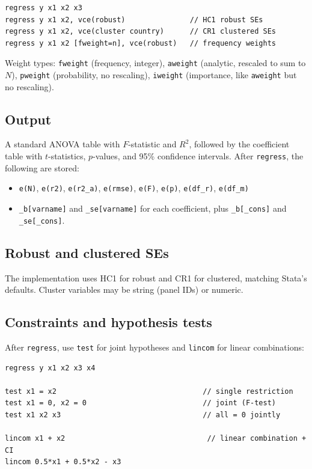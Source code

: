 \documentclass[11pt,letterpaper]{article}
\begin{document}
\begin{lstlisting}
regress y x1 x2 x3
regress y x1 x2, vce(robust)               // HC1 robust SEs
regress y x1 x2, vce(cluster country)      // CR1 clustered SEs
regress y x1 x2 [fweight=n], vce(robust)   // frequency weights
\end{lstlisting}

Weight types: \texttt{fweight} (frequency, integer), \texttt{aweight}
(analytic, rescaled to sum to $N$), \texttt{pweight} (probability,
no rescaling), \texttt{iweight} (importance, like \texttt{aweight} but
no rescaling).

\subsection{Output}

A standard ANOVA table with $F$-statistic and $R^2$, followed by the
coefficient table with $t$-statistics, $p$-values, and 95\% confidence
intervals.  After \texttt{regress}, the following are stored:

\begin{itemize}
\item \texttt{e(N)}, \texttt{e(r2)}, \texttt{e(r2\_a)}, \texttt{e(rmse)},
  \texttt{e(F)}, \texttt{e(p)}, \texttt{e(df\_r)}, \texttt{e(df\_m)}
\item \texttt{\_b[varname]} and \texttt{\_se[varname]} for each
  coefficient, plus \texttt{\_b[\_cons]} and \texttt{\_se[\_cons]}.
\end{itemize}

\subsection{Robust and clustered SEs}

The implementation uses HC1 for robust and CR1 for clustered, matching
Stata's defaults.  Cluster variables may be string (panel IDs) or
numeric.

\subsection{Constraints and hypothesis tests}

After \texttt{regress}, use \texttt{test} for joint hypotheses and
\texttt{lincom} for linear combinations:

\begin{lstlisting}
regress y x1 x2 x3 x4

test x1 = x2                                  // single restriction
test x1 = 0, x2 = 0                           // joint (F-test)
test x1 x2 x3                                 // all = 0 jointly

lincom x1 + x2                                 // linear combination + CI
lincom 0.5*x1 + 0.5*x2 - x3
\end{lstlisting}
\end{document}
